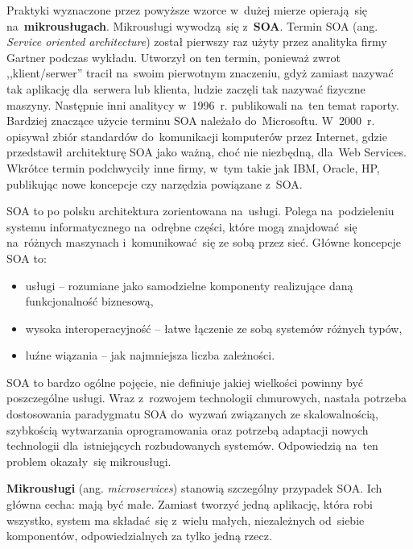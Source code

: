 \documentclass[12pt,a4paper,twoside,titlepage,openright]{book}
\begin{document}
Praktyki wyznaczone przez powyższe wzorce w~dużej mierze opierają~się na~\textbf{mikrousługach}. Mikrousługi wywodzą~się z~\textbf{SOA}. Termin SOA (ang. \textit{Service oriented architecture}) został pierwszy raz użyty przez analityka firmy Gartner podczas wykładu. Utworzył on ten termin, ponieważ zwrot ,,klient/serwer'' tracił na~swoim pierwotnym znaczeniu, gdyż zamiast nazywać tak aplikację dla~serwera lub klienta, ludzie zaczęli tak nazywać fizyczne maszyny. Następnie inni analitycy w~1996~r. publikowali na~ten temat raporty. Bardziej znaczące użycie terminu SOA należało do~Microsoftu. W~2000~r. opisywał zbiór standardów do~komunikacji komputerów przez Internet, gdzie przedstawił architekturę SOA jako ważną, choć nie niezbędną, dla~Web Services. Wkrótce termin podchwyciły inne firmy, w~tym  takie jak IBM, Oracle, HP, publikując nowe koncepcje czy narzędzia powiązane z~SOA. \cite{soaOreily}

SOA to po polsku architektura zorientowana na~usługi. Polega na~podzieleniu systemu informatycznego na~odrębne części, które mogą znajdować~się na~różnych maszynach i~komunikować~się ze sobą przez sieć. Główne koncepcje SOA to: 
\begin{itemize}
\item usługi -- rozumiane jako samodzielne komponenty realizujące daną funkcjonalność biznesową,
\item wysoka interoperacyjność -- łatwe łączenie ze sobą systemów różnych typów,
\item luźne wiązania -- jak najmniejsza liczba zależności. \cite{soaOreily}
\end{itemize}

SOA to bardzo ogólne pojęcie, nie definiuje jakiej wielkości powinny być poszczególne usługi. Wraz z~rozwojem technologii chmurowych, nastała potrzeba dostosowania paradygmatu SOA do~wyzwań związanych ze skalowalnością, szybkością wytwarzania oprogramowania oraz potrzebą adaptacji nowych technologii dla~istniejących rozbudowanych systemów. Odpowiedzią na~ten problem okazały~się mikrousługi.

\textbf{Mikrousługi} (ang. \textit{microservices}) stanowią szczególny przypadek SOA. Ich główna cecha: mają być małe. Zamiast tworzyć jedną aplikację, która robi wszystko, system ma składać~się z~wielu małych, niezależnych od~siebie komponentów, odpowiedzialnych za tylko jedną rzecz. \cite{microservicesPacktNetCore}
\end{document}
